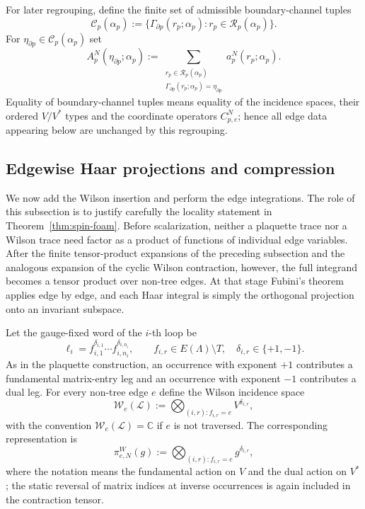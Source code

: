 \documentclass[11pt,a4paper,reqno]{article}
\theoremstyle{definition}
\theoremstyle{remark}
\newcommand\C{\mathbb{C}}
\newcommand\Lc{{\mathcal{L}}}
\begin{document}
For later regrouping, define the finite set of admissible boundary-channel tuples
\[
\mathcal C_p(\alpha_p):=
\{\Gamma_{\partial p}(r_p;\alpha_p):r_p\in\mathcal R_p(\alpha_p)\}.
\]
For $\eta_{\partial p}\in\mathcal C_p(\alpha_p)$ set
\begin{equation}\label{eq:compressed-plaquette-amplitude}
A_p^N(\eta_{\partial p};\alpha_p)
:=\sum_{\substack{r_p\in\mathcal R_p(\alpha_p)\\
\Gamma_{\partial p}(r_p;\alpha_p)=\eta_{\partial p}}}
a_p^N(r_p;\alpha_p).
\end{equation}
Equality of boundary-channel tuples means equality of the incidence spaces, their ordered $V/V^*$ types and the coordinate operators $C^N_{p,e}$; hence all edge data appearing below are unchanged by this regrouping.

\subsection{Edgewise Haar projections and compression}\label{subsec:edgewise-haar}

We now add the Wilson insertion and perform the edge integrations. The role of this subsection is to justify carefully the locality statement in Theorem~\ref{thm:spin-foam}. Before scalarization, neither a plaquette trace nor a Wilson trace need factor as a product of functions of individual edge variables. After the finite tensor-product expansions of the preceding subsection and the analogous expansion of the cyclic Wilson contraction, however, the full integrand becomes a tensor product over non-tree edges. At that stage Fubini's theorem applies edge by edge, and each Haar integral is simply the orthogonal projection onto an invariant subspace.

Let the gauge-fixed word of the $i$-th loop be
\[
\ell_i=f_{i,1}^{\delta_{i,1}}\cdots f_{i,n_i}^{\delta_{i,n_i}},
\qquad f_{i,r}\in E(\Lambda)\setminus T,
\quad \delta_{i,r}\in\{+1,-1\}.
\]
As in the plaquette construction, an occurrence with exponent $+1$ contributes a fundamental matrix-entry leg and an occurrence with exponent $-1$ contributes a dual leg. For every non-tree edge $e$ define the Wilson incidence space
\begin{equation}\label{eq:wilson-edge-space}
\mathcal W_e(\Lc):=
\bigotimes_{(i,r):f_{i,r}=e}V^{\delta_{i,r}},
\end{equation}
with the convention $\mathcal W_e(\Lc)=\C$ if $e$ is not traversed. The corresponding representation is
\begin{equation}\label{eq:wilson-edge-rep}
\pi^W_{e,N}(g):=
\bigotimes_{(i,r):f_{i,r}=e}g^{\delta_{i,r}},
\end{equation}
where the notation means the fundamental action on $V$ and the dual action on $V^*$; the static reversal of matrix indices at inverse occurrences is again included in the contraction tensor.
\end{document}
